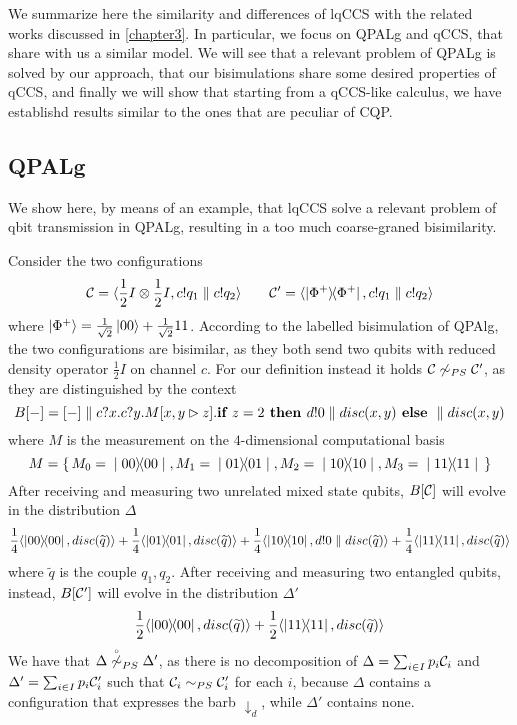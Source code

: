 We summarize here the similarity and differences of lqCCS with
the related works discussed in \ref{chapter3}.
In particular, we focus on QPALg and qCCS, that share with us a similar model.
We will see that a relevant problem of QPALg is solved by our approach, that
our bisimulations share some desired properties of qCCS, and finally we will show
that starting from a qCCS-like calculus, we have establishd results similar to the
ones that are peculiar of CQP.

\subsection{QPALg}
We show here, by means of an example, that lqCCS solve a relevant problem of qbit transmission in QPALg, resulting in a too much coarse-graned bisimilarity. 

Consider the two configurations
\[ \mathcal{C} = \langle\frac{1}{2}I \otimes \frac{1}{2}I, c!q_1 \parallel c!q_2\rangle \qquad \mathcal{C}' = \langle\ket{\Phi^+}\!\!\bra{\Phi^+}, c!q_1 \parallel c!q_2\rangle
\] where $\ket{\Phi^+} = \frac{1}{\sqrt{2}}\ket{00} + \frac{1}{\sqrt{2}}{11}$. According to the labelled bisimulation of QPAlg, the two configurations are bisimilar, as they both send two qubits with reduced density operator $\frac{1}{2}I$ on channel $c$. For our definition instead it holds $\mathcal{C} \not\sim_{PS} \mathcal{C}'$, as they are distinguished by the context \[B[{-}] = [{-}]\parallel c?x.c?y.M[x, y \rhd z].\textbf{if } z = 2 \textbf{ then } d!0 \parallel disc(x, y) \textbf{ else } \parallel disc(x, y)\] where $M$ is the measurement on the $4$-dimensional computational basis \[M = \set{M_0 = \proj{00}, M_1 = \proj{01}, M_2 = \proj{10}, M_3 = \proj{11}}\]
After receiving and measuring two unrelated mixed state qubits, $B[\mathcal{C}]$ will evolve in the distribution  $\Delta$
\[ \frac{1}{4}\confw{\proj{00}, disc(\widetilde{q})} + \frac{1}{4}\confw{\proj{01}, disc(\widetilde{q})} + \frac{1}{4}\confw{\proj{10}, d!0 \parallel disc(\widetilde{q})} + \frac{1}{4}\confw{\proj{11}, disc(\widetilde{q})} \] where $\widetilde{q}$ is the couple $q_1, q_2$.
After receiving and measuring two entangled qubits, instead, $B[\mathcal{C}']$ will evolve in the distribution $\Delta'$
\[ \frac{1}{2}\langle\ket{00}\!\!\bra{00}, disc(\widetilde{q})\rangle +  \frac{1}{2}\langle\ket{11}\!\!\bra{11}, disc(\widetilde{q})\rangle \] 
We have that $\Delta \stackrel{\scriptscriptstyle \circ}{\not\sim}_{PS} \Delta'$, as there is no decomposition of $\Delta = \sum_{i\in I} p_i \mathcal{C}_i$ and $\Delta' = \sum_{i\in I} p_i \mathcal{C}_i'$ such that $\mathcal{C}_i \sim_{PS} \mathcal{C}_i'$ for each $i$, because $\Delta$ contains a configuration that expresses the barb $\downarrow_d$, while $\Delta'$ contains none.

